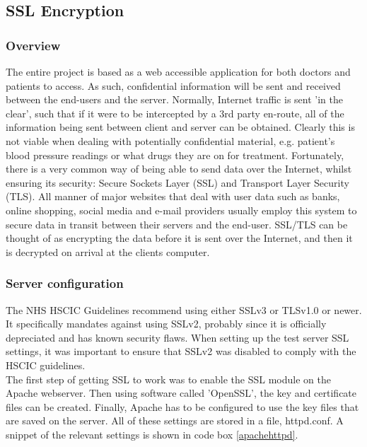 \documentclass[11pt]{article}
\begin{document}
\subsection{SSL Encryption} \label{SSLencryption}
\subsubsection{Overview}
The entire project is based as a web accessible application for both doctors and patients to access. As such, confidential information will be sent and received between the end-users and the server. Normally, Internet traffic is sent 'in the clear', such that if it were to be intercepted by a 3rd party en-route, all of the information being sent between client and server can be obtained. Clearly this is not viable when dealing with potentially confidential material, e.g. patient's blood pressure readings or what drugs they are on for treatment. Fortunately, there is a very common way of being able to send data over the Internet, whilst ensuring its security: Secure Sockets Layer (SSL) and Transport Layer Security (TLS). All manner of major websites that deal with user data such as banks, online shopping, social media and e-mail providers usually employ this system to secure data in transit between their servers and the end-user. SSL/TLS can be thought of as encrypting the data before it is sent over the Internet, and then it is decrypted on arrival at the clients computer. 

\subsubsection{Server configuration}
The NHS HSCIC Guidelines \cite{NHS:hsic:acs} recommend using either SSLv3 or TLSv1.0 or newer. It specifically mandates against using SSLv2, probably since it is officially depreciated and has known security flaws. When setting up the test server SSL settings, it was important to ensure that SSLv2 was disabled to comply with the HSCIC guidelines. 
\\ \indent
The first step of getting SSL to work was to enable the SSL module on the Apache webserver. Then using software called 'OpenSSL', the key and certificate files can be created. Finally, Apache has to be configured to use the key files that are saved on the server. All of these settings are stored in a file, httpd.conf. A snippet of the relevant settings is shown in code box \ref{apachehttpd}.
\end{document}
